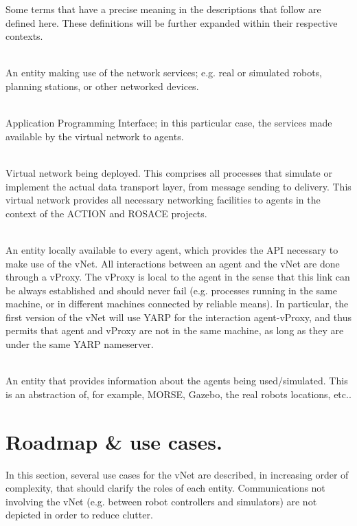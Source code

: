 \documentclass[a4paper,11pt]{article}
\begin{document}
Some terms that have a precise meaning in the descriptions that follow are defined here. These definitions will be further expanded within their respective contexts.

\begin{description}
    \newcommand{\define}[2]{\item[#1:]\hfill\\#2.}
    
    \define{Agent}{An entity making use of the network services; e.g. real or simulated robots, planning stations, or other networked devices}
    
    \define{API}{Application Programming Interface; in this particular case, the services made available by the virtual network to agents}
    
    \define{vNet}{Virtual network being deployed. This comprises all processes that simulate or implement the actual data transport layer, from message sending to delivery. This virtual network provides all necessary networking facilities to agents in the context of the ACTION and ROSACE projects}
    
    \define{vProxy}{An entity locally available to every agent, which provides the API necessary to make use of the vNet. All interactions between an agent and the vNet are done through a vProxy. The vProxy is local to the agent in the sense that this link can be always established and should never fail (e.g. processes running in the same machine, or in different machines connected by reliable means). In particular, the first version of the vNet will use YARP for the interaction agent-vProxy, and thus permits that agent and vProxy are not in the same machine, as long as they are under the same YARP nameserver}
    
    \define{vWorldModel}{An entity that provides information about the agents being used/simulated. This is an abstraction of, for example, MORSE, Gazebo, the real robots locations, etc.}
    
    
\end{description}

\section{Roadmap \& use cases.}

In this section, several use cases for the vNet are described, in increasing order of complexity, that should clarify the roles of each entity. Communications not involving the vNet (e.g. between robot controllers and simulators) are not depicted in order to reduce clutter.
\end{document}
